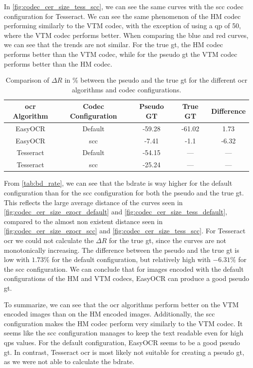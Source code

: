 In \autoref{fig:codec_cer_size_tess_scc}, we can see the same curves with the \gls{scc} codec configuration for Tesseract.
We can see the same phenomenon of the HM codec performing similarly to the VTM codec, with the exception of using a \gls{qp} of 50, where the VTM codec performs better.
When comparing the blue and red curves, we can see that the trends are not similar.
For the true \gls{gt}, the HM codec performs better than the VTM codec, while for the pseudo \gls{gt} the VTM codec performs better than the HM codec.

\begin{table}[h!]
    \centering
    \begin{tabular}{|cc|cc|c|}
        \hline
        \gls{ocr} Algorithm & Codec Configuration & Pseudo GT & True GT & Difference \\
        \hline
        \hline
        EasyOCR & Default & -59.28 & -61.02 & 1.73 \\
        EasyOCR & \gls{scc} & -7.41 & -1.1 & -6.32 \\
        \hline
        Tesseract & Default & -54.15 & --- & --- \\
        Tesseract & \gls{scc} & -25.24 & --- & --- \\
        \hline
    \end{tabular}
    \caption{Comparison of $\Delta R$ in \% between the pseudo and the true \gls{gt} for the different \gls{ocr} algorithms and codec configurations.}
    \label{tab:bd_rate}
\end{table}

From \autoref{tab:bd_rate}, we can see that the \gls{bdrate} is way higher for the default configuration than for the \gls{scc} configuration for both the pseudo and the true \gls{gt}.
This reflects the large average distance of the curves seen in \autoref{fig:codec_cer_size_ezocr_default} and \autoref{fig:codec_cer_size_tess_default}, compared to the almost non existent distance seen in \autoref{fig:codec_cer_size_ezocr_scc} and \autoref{fig:codec_cer_size_tess_scc}.
For Tesseract \gls{ocr} we could not calculate the $\Delta R$ for the true \gls{gt}, since the curves are not monotonically increasing.
The difference between the pseudo and the true \gls{gt} is low with $1.73\%$ for the default configuration, but relatively high with $-6.31\%$ for the \gls{scc} configuration.
We can conclude that for images encoded with the default configurations of the HM and VTM codecs, EasyOCR can produce a good pseudo \gls{gt}.

To summarize, we can see that the \gls{ocr} algorithms perform better on the VTM encoded images than on the HM encoded images.
Additionally, the \gls{scc} configuration makes the HM codec perform very similarly to the VTM codec.
It seems like the \gls{scc} configuration manages to keep the text readable even for high \glspl{qp} values.
For the default configuration, EasyOCR seems to be a good pseudo \gls{gt}.
In contrast, Tesseract \gls{ocr} is most likely not suitable for creating a pseudo \gls{gt}, as we were not able to calculate the \gls{bdrate}.
